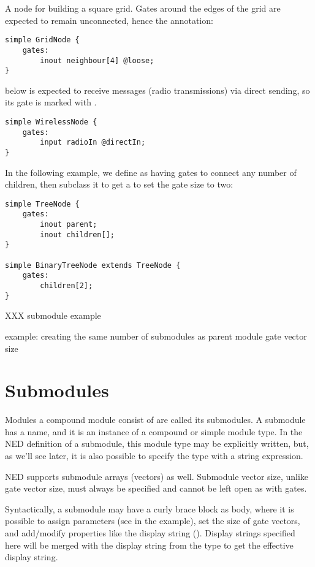 A node for building a square grid. Gates around the edges of the grid are
expected to remain unconnected, hence the  annotation:

\begin{verbatim}
simple GridNode {
    gates:
        inout neighbour[4] @loose;
}
\end{verbatim}

 below is expected to receive messages (radio transmissions)
via direct sending, so its  gate is marked with .

\begin{verbatim}
simple WirelessNode {
    gates:
        input radioIn @directIn;
}
\end{verbatim}

In the following example, we define  as having gates to connect
any number of children, then subclass it to get a  to
set the gate size to two:

\begin{verbatim}
simple TreeNode {
    gates:
        inout parent;
        inout children[];
}

simple BinaryTreeNode extends TreeNode {
    gates:
        children[2];
}
\end{verbatim}

XXX submodule example

example: creating the same number of submodules as parent module gate vector size



\section{Submodules}

Modules a compound module consist of are called its submodules.
A submodule has a name, and it is an instance of a compound or simple
module type. In the NED definition of a submodule, this module type
may be explicitly written, but, as we'll see later, it is also possible
to specify the type with a string expression.

NED supports submodule arrays (vectors) as well. Submodule vector size,
unlike gate vector size, must always be specified and cannot be left
open as with gates.

Syntactically, a submodule may have a curly brace block as body, where
it is possible to assign parameters (see  in the example),
set the size of gate vectors, and add/modify properties like the
display string (). Display strings specified here will
be merged with the display string from the type to get the effective
display string.

